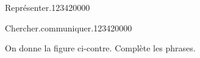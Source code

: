 \begin{pageParcoursd}
\begin{ExoCd}{Représenter.}{1234}{2}{0}{0}{0}{0}
\end{ExoCd}

%
%
%

\begin{ExoCd}{Chercher.communiquer.}{1234}{2}{0}{0}{0}{0}

\begin{minipage}{0.6\linewidth}
On donne la figure ci-contre. Complète les phrases.


\end{minipage}
\end{ExoCd}
\end{pageParcoursd}
